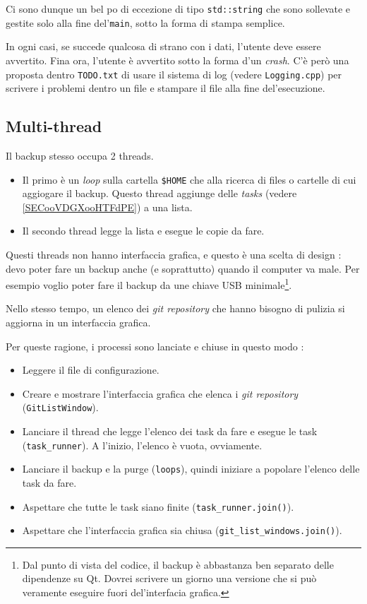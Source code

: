 \documentclass[a4paper,12pt]{article}
\newcommand{\info}[1]{\texttt{#1}}
\begin{document}
Ci sono dunque un bel po di eccezione di tipo \info{std::string} che sono sollevate e gestite solo alla fine del'\info{main}, sotto la forma di stampa semplice.

In ogni casi, se succede qualcosa di strano con i dati, l'utente deve essere avvertito. Fina ora, l'utente è avvertito sotto la forma d'un \emph{crash}. C'è però una proposta dentro \info{TODO.txt} di usare il sistema di log (vedere \info{Logging.cpp}) per scrivere i problemi dentro un file e stampare il file alla fine del'esecuzione.

\subsection{Multi-thread}

Il backup stesso occupa 2 threads.
\begin{itemize}
    \item Il primo è un \emph{loop} sulla cartella \info{\$HOME} che alla ricerca di files o cartelle di cui aggiogare il backup. Questo thread aggiunge delle \emph{tasks} (vedere \ref{SECooVDGXooHTFdPE}) a una lista.
    \item Il secondo thread legge la lista e esegue le copie da fare.
\end{itemize}
Questi threads non hanno interfaccia grafica, e questo è una scelta di design : devo poter fare un backup anche (e soprattutto) quando il computer va male. Per esempio voglio poter fare il backup da une chiave USB minimale\footnote{Dal punto di vista del codice, il backup è abbastanza ben separato delle dipendenze su Qt. Dovrei scrivere un giorno una versione che si può veramente eseguire fuori del'interfacia grafica.}.

Nello stesso tempo, un elenco dei \emph{git repository} che hanno bisogno di pulizia si aggiorna in un interfaccia grafica.

Per queste ragione, i processi sono lanciate e chiuse in questo modo :


\begin{itemize}
    \item Leggere il file di configurazione.
    \item Creare e mostrare l'interfaccia grafica che elenca i \emph{git repository} (\info{GitListWindow}).
    \item Lanciare il thread che legge l'elenco dei task da fare e esegue le task (\info{task\_runner}). A l'inizio, l'elenco è vuota, ovviamente.
    \item Lanciare il backup e la purge (\info{loops}), quindi iniziare a popolare l'elenco delle task da fare.
    \item Aspettare che tutte le task siano finite (\info{task\_runner.join()}).
    \item Aspettare che l'interfaccia grafica sia chiusa (\info{git\_list\_windows.join()}).
\end{itemize}
\end{document}
